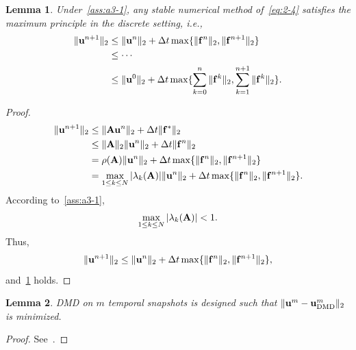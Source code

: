 \documentclass[10pt]{article}
\numberwithin{equation}{section}
\theoremstyle{plain}
\newtheorem{lemma}{Lemma}[section]
\theoremstyle{remark}
\theoremstyle{remark}
\begin{document}
\begin{lemma}
\label{lemma:l2}
Under~\cref{ass:a3-1}, any stable numerical method of~\cref{eq:2-4} satisfies the maximum principle in the discrete setting, i.e.,
\begin{equation}\label{eq:3-3}
\begin{aligned}
\|\bold u^{n+1}\|_2&\leq \|\bold u^n\|_2+\Delta t\max\{\|\bold f^n\|_2,\|\bold f^{n+1}\|_2\}\\
&\leq \cdots\\
& \leq \|\bold u^0\|_2+\Delta t\max\{\sum_{k=0}^n \|\bold f^k\|_2,\sum_{k=1}^{n+1} \|\bold f^k\|_2\}.
\end{aligned}
\end{equation}
\end{lemma}
\begin{proof}
\begin{equation}\label{eq:3-4}
\begin{aligned}
\|\bold u^{n+1}\|_2&\leq \|\bold A\bold u^n\|_2+\Delta t\|\bold f^*\|_2\\
&\leq \|\bold A\|_2\|\bold u^n\|_2+\Delta t\|\bold f^n\|_2\\
&=\rho(\bold A)\|\bold u^n\|_2+\Delta t\max\{\|\bold f^n\|_2,\|\bold f^{n+1}\|_2\}\\
&=\max_{1\leq k\leq N}|\lambda_k(\bold A)|\|\bold u^n\|_2+\Delta t\max\{\|\bold f^n\|_2,\|\bold f^{n+1}\|_2\}.
\end{aligned}
\end{equation}
According to~\cref{ass:a3-1},
\begin{equation}\label{eq:3-5}
\max_{1\leq k\leq N}|\lambda_k(\bold A)|<1.
\end{equation}
Thus,
\begin{equation}\label{eq:3-6}
\|\bold u^{n+1}\|_2\leq \|\bold u^n\|_2+\Delta t\max\{\|\bold f^n\|_2,\|\bold f^{n+1}\|_2\},
\end{equation}
and~\cref{lemma:l2} holds.
\end{proof}


\begin{lemma}
\label{lemma:l3}
DMD on $m$ temporal snapshots is designed such that $\|\bold u^{m}-\bold u_\text{DMD}^{m}\|_2$ is minimized.
\end{lemma}
\begin{proof}
See~\cite{schmid2010dynamic,drmac2018data}.
\end{proof}
\end{document}
